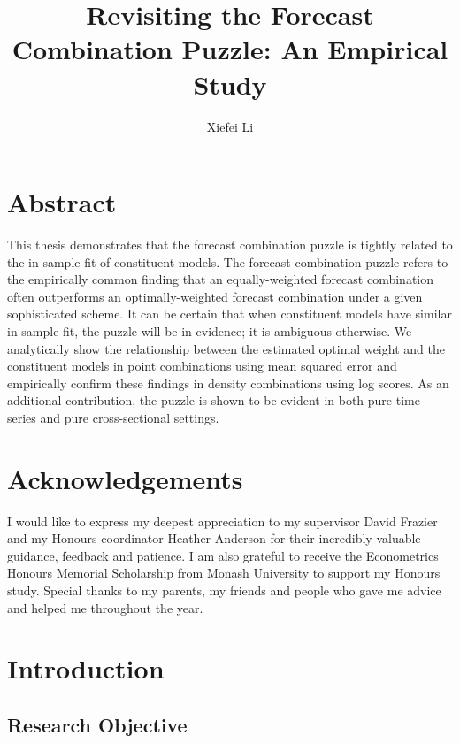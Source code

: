 \documentclass{monashthesis}
\author{Xiefei Li}
\title{Revisiting the Forecast Combination Puzzle: An Empirical Study}
\begin{document}

\titlepage

{\sf\tighttoc\doublespacing}

\clearpage{}\setcounter{page}{1}

\hypertarget{abstract}{%
\chapter*{Abstract}\label{abstract}}

This thesis demonstrates that the forecast combination puzzle is tightly related to the in-sample fit of constituent models. The forecast combination puzzle refers to the empirically common finding that an equally-weighted forecast combination often outperforms an optimally-weighted forecast combination under a given sophisticated scheme. It can be certain that when constituent models have similar in-sample fit, the puzzle will be in evidence; it is ambiguous otherwise. We analytically show the relationship between the estimated optimal weight and the constituent models in point combinations using mean squared error and empirically confirm these findings in density combinations using log scores. As an additional contribution, the puzzle is shown to be evident in both pure time series and pure cross-sectional settings.

\newpage

\hypertarget{acknowledgements}{%
\chapter*{Acknowledgements}\label{acknowledgements}}

I would like to express my deepest appreciation to my supervisor David Frazier and my Honours coordinator Heather Anderson for their incredibly valuable guidance, feedback and patience. I am also grateful to receive the Econometrics Honours Memorial Scholarship from Monash University to support my Honours study. Special thanks to my parents, my friends and people who gave me advice and helped me throughout the year.

\hypertarget{introduction}{%
\chapter{Introduction}\label{introduction}}

\hypertarget{research-objective}{%
\section{Research Objective}\label{research-objective}}
\end{document}
